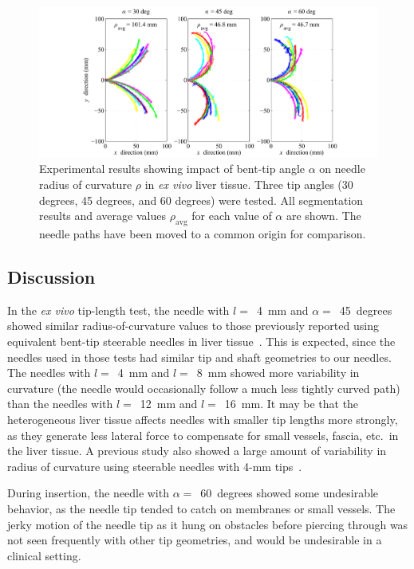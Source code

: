 \begin{figure}[!ht]
\centering
\includegraphics[width=\textwidth]{Images/Chapter3/CurvatureVsAngle/CurvatureVsAngleData}%
\caption[Experimental results showing impact of bent-tip angle]{Experimental results showing impact of bent-tip angle $\alpha$ on needle radius of curvature $\rho$ in \textit{ex vivo} liver tissue. Three tip angles (30 degrees, 45 degrees, and 60 degrees) were tested. All segmentation results and average values $\rho_{\text{avg}}$ for each value of $\alpha$ are shown. The needle paths have been moved to a common origin for comparison.}
\label{fig:CurvatureVsAngleData}
\end{figure}

\subsection{Discussion}
In the \textit{ex vivo} tip-length test, the needle with $l =$~4~mm and $\alpha =$~45~degrees showed similar radius-of-curvature values to those previously reported using equivalent bent-tip steerable needles in liver tissue~\cite{Swaney2013,Patil2014}. This is expected, since the needles used in those tests had similar tip and shaft geometries to our needles. The needles with $l =$~4~mm and $l =$~8~mm showed more variability in curvature (the needle would occasionally follow a much less tightly curved path) than the needles with $l =$~12~mm and $l =$~16~mm. It may be that the heterogeneous liver tissue affects needles with smaller tip lengths more strongly, as they generate less lateral force to compensate for small vessels, fascia, etc.\ in the liver tissue. A previous study also showed a large amount of variability in radius of curvature using steerable needles with 4-mm tips~\cite{Majewicz2010}.

During insertion, the needle with $\alpha =$~60~degrees showed some undesirable behavior, as the needle tip tended to catch on membranes or small vessels. The jerky motion of the needle tip as it hung on obstacles before piercing through was not seen frequently with other tip geometries, and would be undesirable in a clinical setting.

